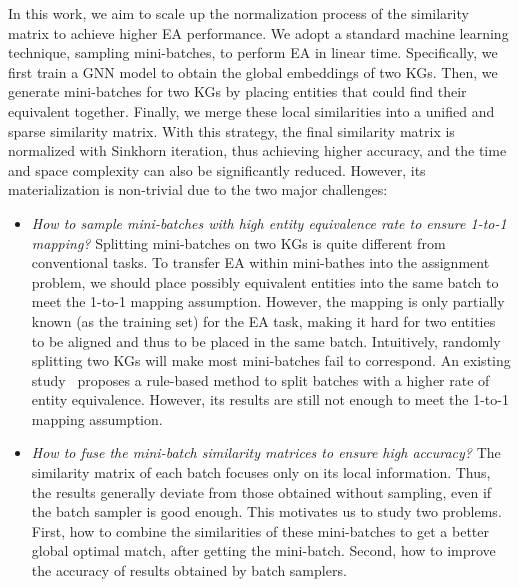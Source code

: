 In this work, we aim to scale up the normalization process of the similarity matrix to achieve higher EA performance. 
We adopt a standard machine learning technique, sampling mini-batches, to perform EA in linear time. 
Specifically, we first train a GNN model to obtain the global embeddings of two KGs.
Then, we generate mini-batches for two KGs by placing entities that could find their equivalent together. 
Finally, we merge these local similarities into a unified and sparse similarity matrix.
With this strategy, the final similarity matrix is normalized with Sinkhorn iteration, thus achieving higher accuracy, and the time and space complexity can also be significantly reduced. 
However, its materialization is non-trivial due to the two major challenges:
\begin{itemize}[topsep=0pt,itemsep=0pt,parsep=0pt,partopsep=0pt,leftmargin=*]
  \item \textit{How to sample mini-batches with high entity equivalence rate to ensure 1-to-1 mapping?} Splitting mini-batches on two KGs is quite different from conventional tasks. To transfer EA within mini-bathes into the assignment problem, we should place possibly equivalent entities into the same batch to meet the 1-to-1 mapping assumption. However, the mapping is only partially known (as the training set) for the EA task, making it hard for two entities to be aligned and thus to be placed in the same batch. Intuitively, randomly splitting two KGs will make most mini-batches fail to correspond. An existing study~\cite{LargeEA22} proposes a rule-based method to split batches with a higher rate of entity equivalence. However, its results are still not enough to meet the 1-to-1 mapping assumption. 
  \item \textit{How to fuse the mini-batch similarity matrices to ensure high accuracy?} The similarity matrix of each batch focuses only on its local information. Thus, the results generally deviate from those obtained without sampling, even if the batch sampler is good enough. This motivates us to study two problems. First, how to combine the similarities of these mini-batches to get a better global optimal match, after getting the mini-batch. Second, how to improve the accuracy of results obtained by batch samplers.
\end{itemize}


